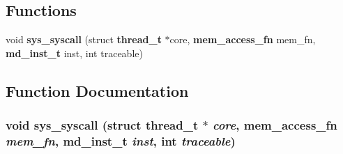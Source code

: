 \subsection*{Functions}
\begin{CompactItemize}
\item 
void {\bf sys\_\-syscall} (struct {\bf thread\_\-t} $\ast$core, {\bf mem\_\-access\_\-fn} mem\_\-fn, {\bf md\_\-inst\_\-t} inst, int traceable)
\end{CompactItemize}


\subsection{Function Documentation}
\subsubsection[{sys\_\-syscall}]{\setlength{\rightskip}{0pt plus 5cm}void sys\_\-syscall (struct {\bf thread\_\-t} $\ast$ {\em core}, \/  {\bf mem\_\-access\_\-fn} {\em mem\_\-fn}, \/  {\bf md\_\-inst\_\-t} {\em inst}, \/  int {\em traceable})}\label{syscall_8h_7b7d5eb9355bf9e9a876e25df407ca6b}


